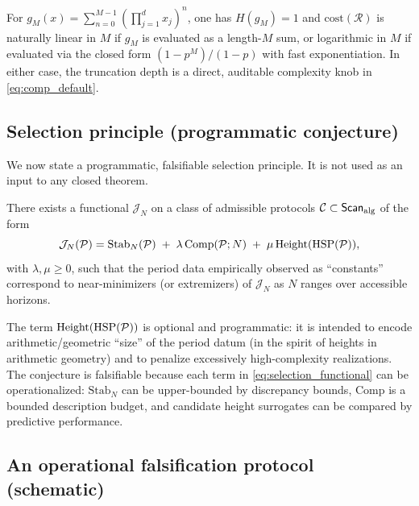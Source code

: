 \begin{remark}
For $g_M(x)=\sum_{n=0}^{M-1}(\prod_{j=1}^d x_j)^n$, one has $H(g_M)=1$ and $\mathrm{cost}(\mathcal{R})$ is naturally linear in $M$ if $g_M$ is evaluated as a length-$M$ sum, or logarithmic in $M$ if evaluated via the closed form $(1-p^M)/(1-p)$ with fast exponentiation. In either case, the truncation depth is a direct, auditable complexity knob in \eqref{eq:comp_default}.
\end{remark}

\subsection{Selection principle (programmatic conjecture)}
\label{sec:selection_conjecture}

We now state a programmatic, falsifiable selection principle. It is not used as an input to any closed theorem.

\begin{conjecture}
\label{conj:selection_principle}
There exists a functional $\mathcal{J}_N$ on a class of admissible protocols $\mathcal{C}\subset\mathsf{Scan}_{\mathrm{alg}}$ of the form
\begin{equation}
\label{eq:selection_functional}
\mathcal{J}_N(\mathcal{P})
=
\mathrm{Stab}_N(\mathcal{P})
\;+\;
\lambda\,\mathrm{Comp}(\mathcal{P};N)
\;+\;
\mu\,\mathrm{Height}(\mathrm{HSP}(\mathcal{P})),
\end{equation}
with $\lambda,\mu\ge 0$, such that the period data empirically observed as ``constants'' correspond to near-minimizers (or extremizers) of $\mathcal{J}_N$ as $N$ ranges over accessible horizons.
\end{conjecture}

The term $\mathrm{Height}(\mathrm{HSP}(\mathcal{P}))$ is optional and programmatic: it is intended to encode arithmetic/geometric ``size'' of the period datum (in the spirit of heights in arithmetic geometry) and to penalize excessively high-complexity realizations. The conjecture is falsifiable because each term in \eqref{eq:selection_functional} can be operationalized: $\mathrm{Stab}_N$ can be upper-bounded by discrepancy bounds, $\mathrm{Comp}$ is a bounded description budget, and candidate height surrogates can be compared by predictive performance.

\subsection{An operational falsification protocol (schematic)}
\label{sec:selection_falsification_protocol}

